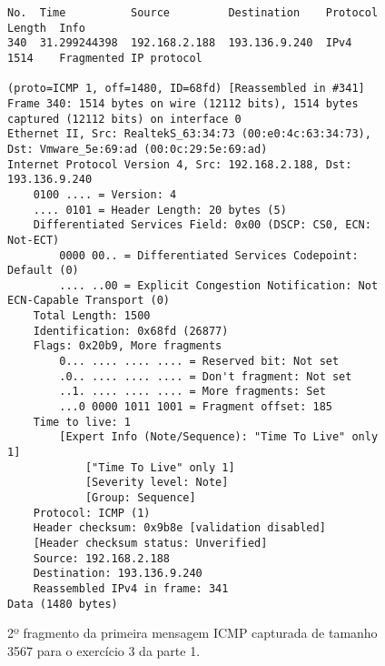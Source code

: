 \begin{figure}[p]
  \centering
\begin{Verbatim}[fontsize=\scriptsize]
No.  Time          Source         Destination    Protocol  Length  Info
340  31.299244398  192.168.2.188  193.136.9.240  IPv4      1514    Fragmented IP protocol

(proto=ICMP 1, off=1480, ID=68fd) [Reassembled in #341]
Frame 340: 1514 bytes on wire (12112 bits), 1514 bytes captured (12112 bits) on interface 0
Ethernet II, Src: RealtekS_63:34:73 (00:e0:4c:63:34:73), Dst: Vmware_5e:69:ad (00:0c:29:5e:69:ad)
Internet Protocol Version 4, Src: 192.168.2.188, Dst: 193.136.9.240
    0100 .... = Version: 4
    .... 0101 = Header Length: 20 bytes (5)
    Differentiated Services Field: 0x00 (DSCP: CS0, ECN: Not-ECT)
        0000 00.. = Differentiated Services Codepoint: Default (0)
        .... ..00 = Explicit Congestion Notification: Not ECN-Capable Transport (0)
    Total Length: 1500
    Identification: 0x68fd (26877)
    Flags: 0x20b9, More fragments
        0... .... .... .... = Reserved bit: Not set
        .0.. .... .... .... = Don't fragment: Not set
        ..1. .... .... .... = More fragments: Set
        ...0 0000 1011 1001 = Fragment offset: 185
    Time to live: 1
        [Expert Info (Note/Sequence): "Time To Live" only 1]
            ["Time To Live" only 1]
            [Severity level: Note]
            [Group: Sequence]
    Protocol: ICMP (1)
    Header checksum: 0x9b8e [validation disabled]
    [Header checksum status: Unverified]
    Source: 192.168.2.188
    Destination: 193.136.9.240
    Reassembled IPv4 in frame: 341
Data (1480 bytes)
\end{Verbatim}
  \caption{2º fragmento da primeira mensagem ICMP capturada de tamanho 3567 para
  o exercício 3 da parte 1.}
  \label{fig:parte1-ex3-pacote-frag2}
\end{figure}

